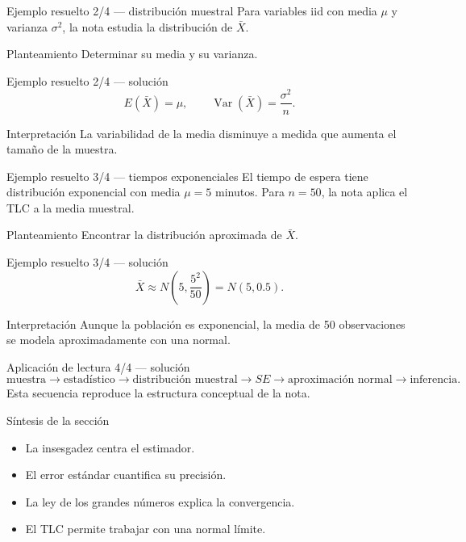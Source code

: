 \documentclass[10pt,aspectratio=169]{beamer}
\begin{document}
\begin{frame}{Ejemplo resuelto 2/4 --- distribución muestral}
  \footnotesize
  Para variables iid con media $\mu$ y varianza $\sigma^2$, la nota estudia la
  distribución de $\bar X$.
  \begin{block}{Planteamiento}
    Determinar su media y su varianza.
  \end{block}
\end{frame}

\begin{frame}{Ejemplo resuelto 2/4 --- solución}
  \footnotesize
  \[
    E(\bar X)=\mu,\qquad \operatorname{Var}(\bar X)=\frac{\sigma^2}{n}.
  \]
  \begin{exampleblock}{Interpretación}
    La variabilidad de la media disminuye a medida que aumenta el tamaño de la
    muestra.
  \end{exampleblock}
\end{frame}

\begin{frame}{Ejemplo resuelto 3/4 --- tiempos exponenciales}
  \footnotesize
  El tiempo de espera tiene distribución exponencial con media $\mu=5$ minutos.
  Para $n=50$, la nota aplica el TLC a la media muestral.
  \begin{block}{Planteamiento}
    Encontrar la distribución aproximada de $\bar X$.
  \end{block}
\end{frame}

\begin{frame}{Ejemplo resuelto 3/4 --- solución}
  \footnotesize
  \[
    \bar X\approx N\!\left(5,\frac{5^2}{50}\right)=N(5,0.5).
  \]
  \begin{alertblock}{Interpretación}
    Aunque la población es exponencial, la media de 50 observaciones se modela
    aproximadamente con una normal.
  \end{alertblock}
\end{frame}

\begin{frame}{Aplicación de lectura 4/4 --- solución}
  \footnotesize
  \[
    \text{muestra}\to\text{estadístico}\to\text{distribución muestral}
    \to SE\to\text{aproximación normal}\to\text{inferencia}.
  \]
  Esta secuencia reproduce la estructura conceptual de la nota.
\end{frame}

\begin{frame}{Síntesis de la sección}
  \footnotesize
  \begin{itemize}\itemsep=0.12cm
    \item La insesgadez centra el estimador.
    \item El error estándar cuantifica su precisión.
    \item La ley de los grandes números explica la convergencia.
    \item El TLC permite trabajar con una normal límite.
  \end{itemize}
\end{frame}
\end{document}
